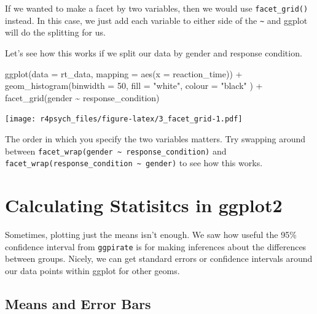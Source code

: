 \documentclass[
]{book}
\newenvironment{Shaded}{\begin{snugshade}}{\end{snugshade}}
\newcommand{\AttributeTok}[1]{\textcolor[rgb]{0.77,0.63,0.00}{#1}}
\newcommand{\DecValTok}[1]{\textcolor[rgb]{0.00,0.00,0.81}{#1}}
\newcommand{\FunctionTok}[1]{\textcolor[rgb]{0.00,0.00,0.00}{#1}}
\newcommand{\NormalTok}[1]{#1}
\newcommand{\SpecialCharTok}[1]{\textcolor[rgb]{0.00,0.00,0.00}{#1}}
\newcommand{\StringTok}[1]{\textcolor[rgb]{0.31,0.60,0.02}{#1}}
\begin{document}
If we wanted to make a facet by two variables, then we would use \texttt{facet\_grid()} instead. In this case, we just add each variable to either side of the \texttt{\textasciitilde{}} and ggplot will do the splitting for us.

Let's see how this works if we split our data by gender and response condition.

\begin{Shaded}
\begin{Highlighting}[]
\FunctionTok{ggplot}\NormalTok{(}\AttributeTok{data =}\NormalTok{ rt\_data, }\AttributeTok{mapping =} \FunctionTok{aes}\NormalTok{(}\AttributeTok{x =}\NormalTok{ reaction\_time)) }\SpecialCharTok{+}
  \FunctionTok{geom\_histogram}\NormalTok{(}\AttributeTok{binwidth =} \DecValTok{50}\NormalTok{, }
                 \AttributeTok{fill =} \StringTok{"white"}\NormalTok{, }
                 \AttributeTok{colour =} \StringTok{"black"}
\NormalTok{                 ) }\SpecialCharTok{+}
  \FunctionTok{facet\_grid}\NormalTok{(gender }\SpecialCharTok{\textasciitilde{}}\NormalTok{ response\_condition)}
\end{Highlighting}
\end{Shaded}

\texttt{[image: r4psych\_files/figure-latex/3\_facet\_grid-1.pdf]}

The order in which you specify the two variables matters. Try swapping around between \texttt{facet\_wrap(gender\ \textasciitilde{}\ response\_condition)} and \texttt{facet\_wrap(response\_condition\ \textasciitilde{}\ gender)} to see how this works.

\hypertarget{calculating-statisitcs-in-ggplot2}{%
\section{Calculating Statisitcs in ggplot2}\label{calculating-statisitcs-in-ggplot2}}

Sometimes, plotting just the means isn't enough. We saw how useful the 95\% confidence interval from \texttt{ggpirate} is for making inferences about the differences between groups. Nicely, we can get standard errors or confidence intervals around our data points within ggplot for other geoms.

\hypertarget{means-and-error-bars}{%
\subsection{Means and Error Bars}\label{means-and-error-bars}}
\end{document}
